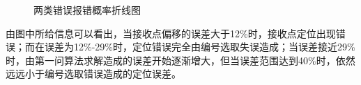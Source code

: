 \documentclass{ctexart}
\begin{document}
\begin{figure}[H]
  \center
  
  \hspace{-20pt}%
  \caption{两类错误报错概率折线图}
  \label{两类错误报错概率折线图}
  \end{figure}

  由图中所给信息可以看出，当接收点偏移的误差大于12\%时，接收点定位出现错误；而在误差为12\%-29\%时，定位错误完全由编号选取失误造成；当误差接近29\%时，由第一问算法求解造成的误差开始逐渐增大，但当误差范围达到40\%时，依然远远小于编号选取错误造成的定位误差。
\end{document}
